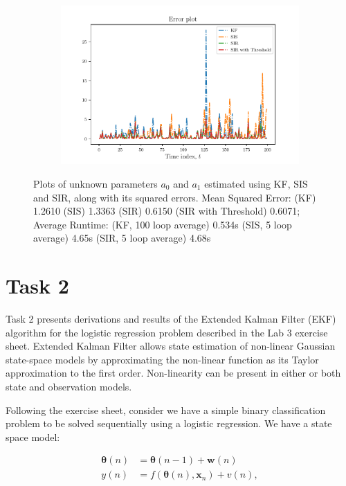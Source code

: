 \documentclass{article}
\begin{document}
\begin{figure}
    \centering
    \begin{subfigure}{.6\textwidth}
        \includegraphics[width=\textwidth]{Figures/error.pdf}
    \end{subfigure}
    \caption{Plots of unknown parameters $a_0$ and $a_1$ estimated using KF, SIS and SIR, along with its squared errors. Mean Squared Error: (KF) 1.2610 (SIS) 1.3363 (SIR) 0.6150 (SIR with Threshold) 0.6071; Average Runtime: (KF, 100 loop average) 0.534s (SIS, 5 loop average) 4.65s (SIR, 5 loop average) 4.68s}
    \label{fig:results-1}
\end{figure}


\section{Task 2} \label{sec:task-2}

Task 2 presents derivations and results of the Extended Kalman Filter (EKF) algorithm for the logistic regression problem described in the Lab 3 exercise sheet. Extended Kalman Filter allows state estimation of non-linear Gaussian state-space models by approximating the non-linear function as its Taylor approximation to the first order. Non-linearity can be present in either or both state and observation models.

Following the exercise sheet, consider we have a simple binary classification problem to be solved sequentially using a logistic regression. We have a state space model:

\begin{equation}
    \begin{split}
        \pmb{\theta} (n) &= \pmb{\theta} (n-1) + \pmb{w}(n)\\
        y(n) &= f(\pmb{\theta}(n), \pmb{x}_n) + v(n),
    \end{split}
    \label{eq:ssm}
\end{equation}
\end{document}
